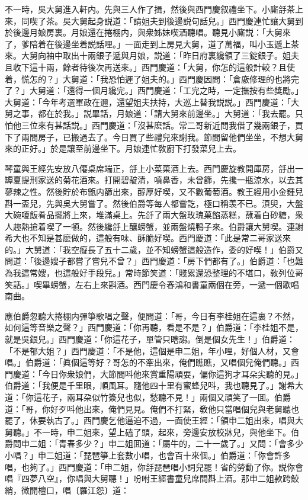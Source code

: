 不一時，吳大舅進入軒内。先與三人作了揖，然後與西門慶叙禮坐下。小廝㧱茶上來，同喫了茶。吳大舅起身説道：「請姐夫到後邊説句話兒。」西門慶連忙讓大舅到於後邊月娘房裏。月娘還在捲棚内，與衆姊妹喫酒聽唱。聽見小廝説：「大舅來了，爹陪着在後邊坐着説話哩。」一面走到上房見大舅，道了萬福，叫小玉遞上茶來。大舅向袖中取出十兩銀子遞與月娘，説道：「昨日府裏纔領了三錠銀子。姐夫且收下這十兩，餘者待後次再送來。」西門慶道：「大舅，你怎的這般計較？且使着，慌怎的？」大舅道：「我恐怕遲了姐夫的。」西門慶因問：「倉廒修理的也將完了？」大舅道：「還得一個月纔完。」西門慶道：「工完之時，一定撫按有些獎勵。」大舅道：「今年考選軍政在邇，還望姐夫扶持，大巡上替我説説。」西門慶道：「大舅之事，都在於我。」説畢話，月娘道：「請大舅來前邊坐。」大舅道：「我去罷。只怕他三位來有甚話説。」西門慶道：「沒甚麽話。常二哥新近問我借了幾兩銀子，買下了兩間房子，已搬過去了。今日買了些禮兒來謝我。節間留他們坐坐，不想大舅來的正好。」於是讓至前邊坐下。月娘連忙敎廚下打發菜兒上去。

琴童與王經先安放八僊桌席端正，㧱上小菜菓酒上去。西門慶旋教開庫房，㧱出一罈夏提刑家送的菊花酒來。打開碧靛清，噴鼻香，未曾篩，先攙一瓶涼水，以去其蓼辣之性。然後貯於布甑内篩出來，醇厚好喫，又不數葡萄酒。教王經用小金鍾兒斟一盃兒，先與吳大舅嘗了。然後伯爵等每人都嘗訖，極口稱羡不已。湏臾，大盤大碗嗄飯肴品擺將上來，堆滿桌上。先㧱了兩大盤玫瑰菓餡蒸糕，蘸着白砂糖，衆人趂熱搶着喫了一頓。然後纔㧱上釀螃蟹，並兩盤燒鴨子來。伯爵讓大舅喫。連謝希大也不知是甚麽做的，這般有味、酥脆好喫。西門慶道：「此是常二哥家送來的。」大舅道：「我空癡長了五十二歲，並不知螃蟹這般造作，委的好喫！」伯爵又問道：「後邊嫂子都嘗了嘗兒不曾？」西門慶道：「房下們都有了。」伯爵道：「也難為我這常嫂，也這般好手段兒。」常時節笑道：「賤累還恐整理的不堪口，敎列位哥笑話。」喫畢螃蟹，左右上來斟酒。西門慶令春鴻和書童兩個在旁，一遞一個歌唱南曲。

應伯爵忽聽大捲棚内彈箏歌唱之聲，便問道：「哥，今日有李桂姐在這裏？不然，如何這等音樂之聲？」西門慶道：「你再聽，看是不是？」伯爵道：「李桂姐不是，就是吳銀兒。」西門慶道：「你這花子，單管只瞎謅。倒是個女先生！」伯爵道：「不是郁大姐？」西門慶道：「不是他，這個是申二姐，年小哩，好個人材，又會唱。」伯爵道：「眞個這等好？哥怎的不牽出來，俺們瞧瞧，又唱個兒俺們聽。」西門慶道：「今日你衆娘們，大節間呌他來賞重陽頑耍，偏你這狗才耳朵尖聽的見。」伯爵道：「我便是千里眼，順風耳。隨他四十里有蜜蜂兒呌，我也聽見了。」謝希大道：「你這花子，兩耳朶似竹簽兒也似，愁聽不見！」兩個又頑笑了一囬。伯爵道：「哥，你好歹呌他出來，俺們見見。俺們不打緊，敎他只當唱個兒與老舅聽也罷了，休要執古了。」西門慶乞他逼迫不過，一面使王經：「領申二姐出來，唱與大舅聽。」不一時，申二姐來，望上磕了頭，起來，旁邊安放校牀兒，與他坐下。伯爵問申二姐：「青春多少？」申二姐囬道：「屬牛的，二十一歲了。」又問：「會多少小唱？」申二姐道：「琵琶箏上套數小唱，也會百十來個。」伯爵道：「你會許多唱，也夠了。」西門慶道：「申二姐，你㧱琵琶唱小詞兒罷！省的勞動了你。説你會唱『四夢八空』，你唱與大舅聽！」吩咐王經書童兒席間斟上酒。那申二姐款跨鮫綃，微開檀口，唱〔羅江怨〕道：

